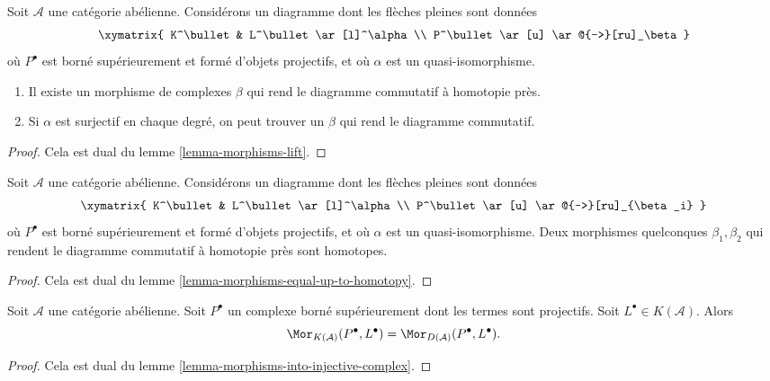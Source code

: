 \begin{lemma}
\label{lemma-morphisms-lift-projective}
Soit $\mathcal{A}$ une catégorie abélienne. Considérons un diagramme dont les
flèches pleines sont données
$$
\xymatrix{
K^\bullet & L^\bullet \ar[l]^\alpha \\
P^\bullet \ar[u] \ar@{-->}[ru]_\beta
}
$$
où $P^\bullet$ est borné supérieurement et formé d'objets projectifs, et où
$\alpha$ est un quasi-isomorphisme.
\begin{enumerate}
\item Il existe un morphisme de complexes $\beta$ qui rend le diagramme
commutatif à homotopie près.
\item Si $\alpha$ est surjectif en chaque degré, on peut trouver un $\beta$
qui rend le diagramme commutatif.
\end{enumerate}
\end{lemma}

\begin{proof}
Cela est dual du lemme \ref{lemma-morphisms-lift}.
\end{proof}

\begin{lemma}
\label{lemma-morphisms-equal-up-to-homotopy-projective}
Soit $\mathcal{A}$ une catégorie abélienne. Considérons un diagramme dont les
flèches pleines sont données
$$
\xymatrix{
K^\bullet & L^\bullet \ar[l]^\alpha \\
P^\bullet \ar[u] \ar@{-->}[ru]_{\beta_i}
}
$$
où $P^\bullet$ est borné supérieurement et formé d'objets projectifs, et où
$\alpha$ est un quasi-isomorphisme. Deux morphismes quelconques
$\beta_1, \beta_2$ qui rendent le diagramme commutatif à homotopie près sont
homotopes.
\end{lemma}

\begin{proof}
Cela est dual du lemme \ref{lemma-morphisms-equal-up-to-homotopy}.
\end{proof}

\begin{lemma}
\label{lemma-morphisms-from-projective-complex}
Soit $\mathcal{A}$ une catégorie abélienne. Soit $P^\bullet$ un complexe borné
supérieurement dont les termes sont projectifs. Soit
$L^\bullet \in K(\mathcal{A})$. Alors
$$
\Mor_{K(\mathcal{A})}(P^\bullet, L^\bullet)
=
\Mor_{D(\mathcal{A})}(P^\bullet, L^\bullet).
$$
\end{lemma}

\begin{proof}
Cela est dual du lemme \ref{lemma-morphisms-into-injective-complex}.
\end{proof}

